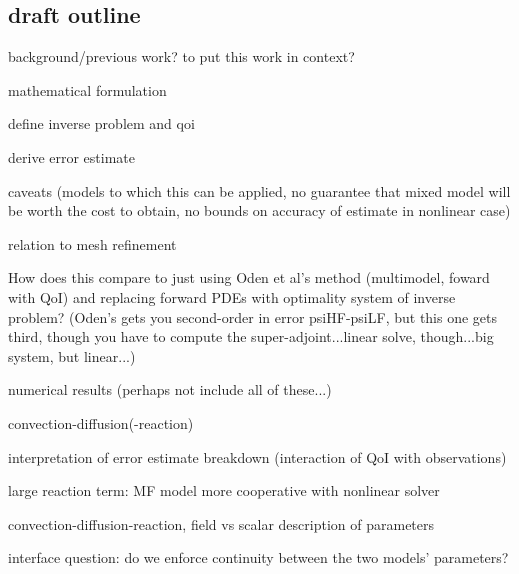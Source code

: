\subsection{draft outline}
\bit 
\item background/previous work? to put this work in context?
\item mathematical formulation
  \bit
  \item define inverse problem and qoi
  \item derive error estimate
  \item caveats (models to which this can be applied, no guarantee that mixed model will be worth the cost to obtain, no bounds on accuracy of estimate in nonlinear case)
  \item relation to mesh refinement
  \item How does this compare to just using Oden et al's method (multimodel, foward with QoI) and replacing forward PDEs with optimality system of inverse problem? (Oden's gets you second-order in error psiHF-psiLF, but this one gets third, though you have to compute the super-adjoint...linear solve, though...big system, but linear...)
  \eit
\item numerical results (perhaps not include all of these...)
  \bit
  \item convection-diffusion(-reaction)
    \bit
    \item interpretation of error estimate breakdown (interaction of QoI with observations)
    \item large reaction term: MF model more cooperative with nonlinear solver
    \eit
  \item convection-diffusion-reaction, field vs scalar description of parameters
    \bit
    \item interface question: do we enforce continuity between the two models' parameters?

